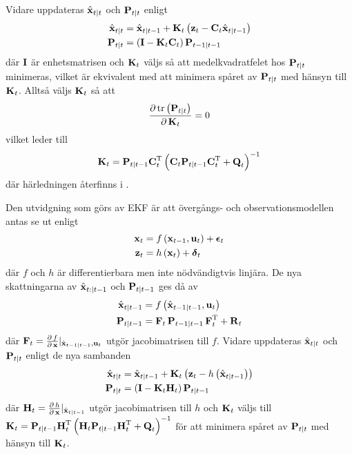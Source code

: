 \documentclass[11pt]{article}
\newcommand{\bfr}[1]{\textbf{\textrm{{#1}}}}
\begin{document}
\begin{flushleft}
Vidare uppdateras $\hat{\bfr{x}}_{t\vert t}$ och $\bfr{P}_{t\vert t}$ enligt
\begin{align*}
	\hat{\bfr{x}}_{t\vert t} &= \hat{\bfr{x}}_{t\vert t-1} + \bfr{K}_{t}\left(\bfr{z}_{t} - \bfr{C}_{t}\hat{\bfr{x}}_{t\vert t-1}\right) \\
	\bfr{P}_{t\vert t} &= \left(\bfr{I} - \bfr{K}_{t}\bfr{C}_{t}\right)\bfr{P}_{t-1\vert t-1}
\end{align*}
där $\bfr{I}$ är enhetsmatrisen och $\bfr{K}_{t}$ väljs så att medelkvadratfelet hos $\bfr{P}_{t\vert t}$ minimeras, vilket är ekvivalent med att minimera spåret av $\bfr{P}_{t\vert t}$ med hänsyn till $\bfr{K}_{t}$. Alltså väljs $\bfr{K}_{t}$ så att
\begin{align*}
	\frac{\partial\,\mathrm{tr}\left(\bfr{P}_{t\vert t}\right)}{\partial\,\bfr{K}_{t}} = 0
\end{align*}
vilket leder till
\begin{align*}
	\bfr{K}_{t} = \bfr{P}_{t\vert t-1}\bfr{C}_{t}^{\mathrm{T}}\left(\bfr{C}_{t}\bfr{P}_{t\vert t-1}\bfr{C}_{t}^{\mathrm{T}} + \bfr{Q}_{t}\right)^{-1}
\end{align*}
där härledningen återfinns i \cite{filtering}. 

Den utvidgning som görs av EKF är att övergångs- och observationsmodellen antas se ut enligt
\begin{align*}
	\bfr{x}_{t} &= f\left(\bfr{x}_{t-1}, \bfr{u}_{t}\right) + \boldsymbol{\epsilon}_{t} \\
	\bfr{z}_{t} &= h\left(\bfr{x}_{t}\right) + \boldsymbol{\delta}
_{t}
\end{align*}
där $f$ och $h$ är differentierbara men inte nödvändigtvis linjära. De nya skattningarna av $\hat{\bfr{x}}_{t:\vert t-1}$ och $\bfr{P}_{t\vert t-1}$ ges då av 
\begin{align*}
	\hat{\bfr{x}}_{t\vert t-1} &= f\left(\hat{\bfr{x}}_{t-1\vert t-1},\bfr{u}_{t}\right) \\
	\bfr{P}_{t\vert t-1} & = \bfr{F}_{t}\,\bfr{P}_{t-1\vert t-1}\,\bfr{F}_{t}^{\mathrm{T}} + \bfr{R}_t
\end{align*}
där $\bfr{F}_{t} = \frac{\partial\,f}{\partial\,\bfr{x}}\rvert_{\hat{\bfr{x}}_{t-1 \vert t-1}, \bfr{u}_{t}}$ utgör jacobimatrisen till $f$. Vidare uppdateras $\hat{\bfr{x}}_{t\vert t}$ och $\bfr{P}_{t\vert t}$ enligt de nya sambanden
\begin{align*}
	\hat{\bfr{x}}_{t\vert t} &= \hat{\bfr{x}}_{t\vert t-1} + \bfr{K}_{t}\left(\bfr{z}_{t} - h\left(\hat{\bfr{x}}_{t\vert t-1}\right)\right) \\
	\bfr{P}_{t\vert t} &= \left(\bfr{I} - \bfr{K}_{t}\bfr{H}_{t}\right)\bfr{P}_{t\vert t-1}	
\end{align*}
där $\bfr{H}_{t} = \frac{\partial\,h}{\partial\,\bfr{x}}\rvert_{\hat{\bfr{x}}_{t\vert t-1}}$ utgör jacobimatrisen till $h$ och $\bfr{K}_{t}$ väljs till $\bfr{K}_{t} = \bfr{P}_{t\vert t-1}\bfr{H}_{t}^{\mathrm{T}}\left(\bfr{H}_{t}\bfr{P}_{t\vert t-1}\bfr{H}_{t}^{\mathrm{T}} + \bfr{Q}_{t}\right)^{-1}$ för att minimera spåret av $\bfr{P}_{t\vert t}$ med hänsyn till $\bfr{K}_{t}$.


\end{flushleft}
\end{document}
